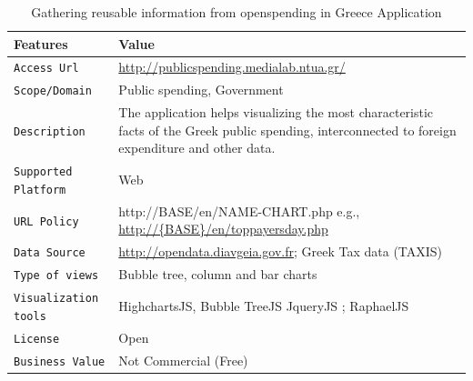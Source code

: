 \begin{table}[ht!b]
    \caption{Gathering reusable information from openspending in Greece Application} \label{tab:describeApps}
    \small
    \center
    \begin{tabularx}{\textwidth}{@{}lX@{}}
    \toprule
    \textbf{Features} & \textbf{Value}\\
    \toprule
    \texttt{Access Url }&	\url{http://publicspending.medialab.ntua.gr/}\\
    \midrule
    \texttt{Scope/Domain} &	Public spending, Government \\
    \midrule
    \texttt{Description} & The application helps visualizing the most characteristic facts of the Greek public spending, interconnected to foreign expenditure and other data. \\
    \midrule
    \texttt{Supported Platform} &	Web \\ 
    \midrule
    \texttt{URL Policy}   &  http://{BASE}/en/{NAME-CHART}.php e.g., \url{http://{BASE}/en/toppayersday.php} \\
    \midrule
    \texttt{Data Source}	& \url{http://opendata.diavgeia.gov.fr}; Greek Tax data (TAXIS) \\ 
    \midrule
\texttt{Type of views} & Bubble tree, column and bar charts \\ 
    \midrule
   \texttt{Visualization tools} &  HighchartsJS,  Bubble TreeJS JqueryJS ; RaphaelJS \\ 
   \midrule
  \texttt{License} & Open \\ 
    \midrule
\texttt{Business Value} & Not Commercial (Free) \\ 
    \bottomrule
  
    \end{tabularx}
    \end{table}
   


